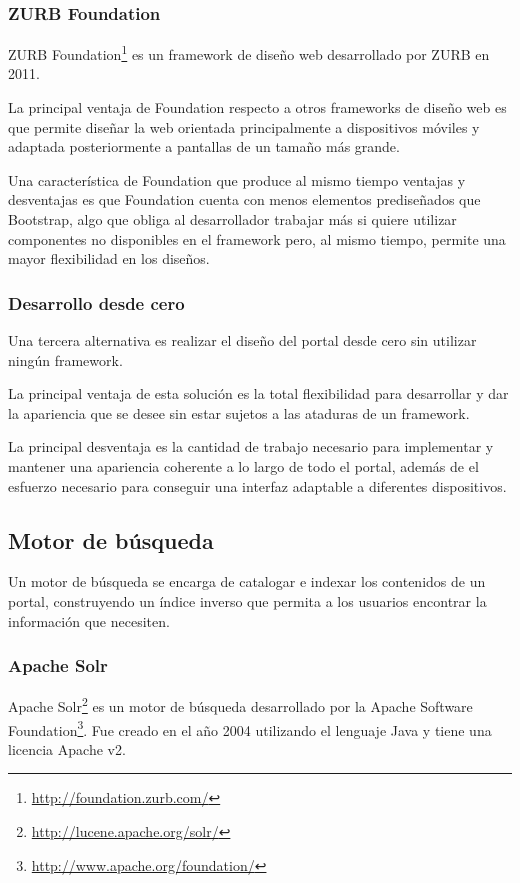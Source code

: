 \subsubsection{ZURB Foundation}
ZURB Foundation\footnote{\url{http://foundation.zurb.com/}} es un framework de diseño web desarrollado por ZURB en 2011.

La principal ventaja de Foundation respecto a otros frameworks de diseño web es que permite diseñar la web orientada principalmente a dispositivos móviles y adaptada posteriormente a pantallas de un tamaño más grande.

Una característica de Foundation que produce al mismo tiempo ventajas y desventajas es que Foundation cuenta con menos elementos prediseñados que Bootstrap, algo que obliga al desarrollador trabajar más si quiere utilizar componentes no disponibles en el framework pero, al mismo tiempo, permite una mayor flexibilidad en los diseños.


\subsubsection{Desarrollo desde cero}
Una tercera alternativa es realizar el diseño del portal desde cero sin utilizar ningún framework.

La principal ventaja de esta solución es la total flexibilidad para desarrollar y dar la apariencia que se desee sin estar sujetos a las ataduras de un framework.

La principal desventaja es la cantidad de trabajo necesario para implementar y mantener una apariencia coherente a lo largo de todo el portal, además de el esfuerzo necesario para conseguir una interfaz adaptable a diferentes dispositivos.



\subsection{Motor de búsqueda}
Un motor de búsqueda se encarga de catalogar e indexar los contenidos de un portal, construyendo un índice inverso que permita a los usuarios encontrar la información que necesiten.


\subsubsection{Apache Solr}
Apache Solr\footnote{\url{http://lucene.apache.org/solr/}} es un motor de búsqueda desarrollado por la Apache Software Foundation\footnote{\url{http://www.apache.org/foundation/}}.  Fue creado en el año 2004 utilizando el lenguaje Java y tiene una licencia Apache v2.

